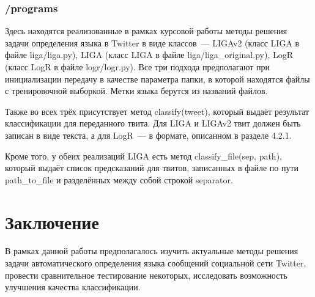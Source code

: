 \documentclass[a4paper, 14pt]{article}
\begin{document}
			\subsubsection{/programs}
				Здесь находятся реализованные в рамках курсовой работы методы решения задачи определения языка в Twitter в виде классов~--- LIGAv2 (класс LIGA в файле liga/liga.py), LIGA (класс LIGA в файле liga/liga_original.py), LogR (класс LogR в файле logr/logr.py). Все три подхода
				предполагают при инициализации передачу в качестве параметра папки, в которой находятся файлы с тренировочной выборкой. Метки языка
				берутся из названий файлов.
				
				Также во всех трёх присутствует метод classify(tweet), который выдаёт результат классификации для переданного твита. Для LIGA и LIGAv2 твит должен быть записан в виде текста, а для LogR~--- в формате, описанном в разделе 4.2.1.
				
				Кроме того, у обеих реализаций LIGA есть метод classify_file(sep, path), который выдаёт список предсказаний для твитов,
				записанных в файле по пути path_to_file и разделённых между собой строкой separator.

\pagebreak
	
\section{Заключение}
		В рамках данной работы предполагалось изучить актуальные методы решения задачи автоматического определения языка сообщений социальной сети Twitter, провести сравнительное тестирование некоторых, исследовать возможность улучшения качества классификации. 
		
\end{document}
